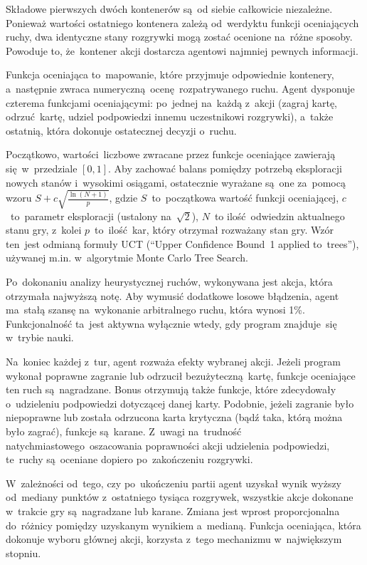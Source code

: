 \documentclass[declaration,shortabstract,inz]{iithesis}
\begin{document}
Składowe pierwszych dwóch kontenerów są~od siebie całkowicie niezależne. Ponieważ wartości ostatniego kontenera zależą od~werdyktu funkcji oceniających ruchy, dwa identyczne stany rozgrywki mogą zostać ocenione na~różne sposoby. Powoduje to, że~kontener akcji dostarcza agentowi najmniej pewnych informacji.

Funkcja oceniająca to~mapowanie, które przyjmuje odpowiednie kontenery, a~następnie zwraca numeryczną ocenę rozpatrywanego ruchu. Agent dysponuje czterema funkcjami oceniającymi: po~jednej na~każdą z~akcji (zagraj kartę, odrzuć kartę, udziel podpowiedzi innemu uczestnikowi rozgrywki), a~także ostatnią, która dokonuje ostatecznej decyzji o~ruchu.

Początkowo, wartości liczbowe zwracane przez funkcje oceniające zawierają się w~przedziale $[0,1]$. Aby zachować balans pomiędzy potrzebą eksploracji nowych stanów i~wysokimi osiągami, ostatecznie wyrażane są~one za~pomocą wzoru ${S+c\sqrt{\frac{\ln (N+1)}{p}}}$, gdzie $S$~to~początkowa wartość funkcji oceniającej, $c$~to~parametr eksploracji (ustalony na~$\sqrt{2}$), $N$~to ilość odwiedzin aktualnego stanu gry, z~kolei $p$~to~ilość kar, który otrzymał rozważany stan gry. Wzór ten~jest odmianą formuły UCT (``Upper Confidence Bound~1 applied to~trees''), używanej m.in. w~algorytmie Monte Carlo Tree Search\cite{UCT}.

Po~dokonaniu analizy heurystycznej ruchów, wykonywana jest akcja, która otrzymała najwyższą notę. Aby wymusić dodatkowe losowe błądzenia, agent ma~stałą szansę na~wykonanie arbitralnego ruchu, która wynosi 1\%. Funkcjonalność ta~jest aktywna wyłącznie wtedy, gdy program znajduje~się w~trybie nauki.

Na~koniec każdej z~tur, agent rozważa efekty wybranej akcji. Jeżeli program wykonał poprawne zagranie lub odrzucił bezużyteczną kartę, funkcje oceniające ten ruch są~nagradzane. Bonus otrzymują także funkcje, które zdecydowały o~udzieleniu podpowiedzi dotyczącej danej karty. Podobnie, jeżeli zagranie było niepoprawne lub została odrzucona karta krytyczna (bądź taka, którą można było zagrać), funkcje są~karane. Z~uwagi na~trudność natychmiastowego oszacowania poprawności akcji udzielenia podpowiedzi, te~ruchy są~oceniane dopiero po~zakończeniu rozgrywki.

W~zależności od~tego, czy po~ukończeniu partii agent uzyskał wynik wyższy od~mediany punktów z~ostatniego tysiąca rozgrywek, wszystkie akcje dokonane w~trakcie gry są~nagradzane lub karane. Zmiana jest wprost proporcjonalna do~różnicy pomiędzy uzyskanym wynikiem a~medianą. Funkcja oceniająca, która dokonuje wyboru głównej akcji, korzysta z~tego mechanizmu w~największym stopniu.
\end{document}
